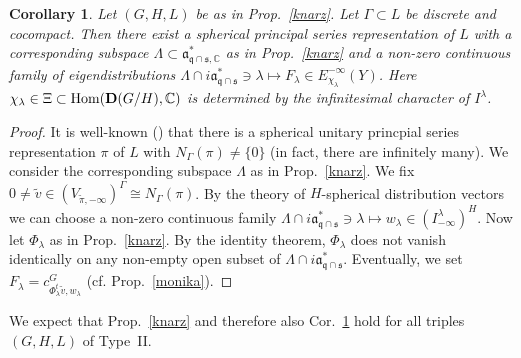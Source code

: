 \documentclass[10]{amsart}
\newtheorem{cor}[thm]{Corollary}
\theoremstyle{remark}
\theoremstyle{definition}
\numberwithin{equation}{section}
\newcommand{\C}{\mathbb{C}}           %
\newcommand{\Hom}{\mathrm{Hom}}
\newcommand{\fa}{{\mathfrak a}}             %
\newcommand{\fq}{{\mathfrak q}}
\newcommand{\fs}{{\mathfrak s}}
\begin{document}
{%


\begin{cor}\label{knorz}
Let $(G,H,L)$ be as in Prop.~\ref{knarz}. Let $\Gamma\subset L$ be discrete and cocompact.
Then there exist a spherical principal series representation of $L$ with a corresponding subspace $\Lambda\subset \fa_{\fq\cap\fs,\C}^*$ as in Prop.~\ref{knarz} and 
a non-zero continuous family of eigendistributions $\Lambda\cap i\fa_{\fq\cap\fs}^*\ni\lambda\mapsto F_\lambda\in  E_{\chi_\lambda}^{-\infty}(Y)$.
Here $\chi_\lambda\in \Xi\subset\Hom({\bf D}(G/H),\C)$ is determined by the infinitesimal character of $I^\lambda$. 
\end{cor}

\begin{proof} It is well-known (\cite{DKV79}) that there is a spherical unitary princpial series representation $\pi$ of $L$ with $N_\Gamma(\pi)\ne\{0\}$ (in fact, there are infinitely many).
We consider the corresponding subspace $\Lambda$ as in Prop.~\ref{knarz}. We fix $0\ne \tilde v\in (V_{\tilde\pi,-\infty})^\Gamma\cong N_\Gamma(\pi)$. By the theory of $H$-spherical distribution vectors \cite{Ban88} we can choose a non-zero continuous family $\Lambda\cap i\fa_{\fq\cap\fs}^*\ni\lambda\mapsto w_\lambda\in (I^\lambda_{-\infty})^H$.  Now let $\Phi_\lambda$ as in Prop.~\ref{knarz}. By the identity theorem, $\Phi_\lambda$ does not vanish identically on any non-empty open subset of 
$\Lambda\cap i\fa_{\fq\cap\fs}^*$.
Eventually, we set $F_\lambda=c^G_{\Phi_\lambda^t\tilde v, w_\lambda}$ (cf. Prop.~\ref{monika}).
\end{proof}

We expect that Prop.~\ref{knarz} and therefore also Cor.~\ref{knorz} hold for all triples $(G,H,L)$ of Type~II.
 
}
\end{document}
